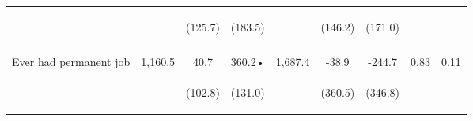 \begin{tabular}{lcccccccc}
 & \begin{footnotesize}\end{footnotesize} & \begin{footnotesize}(125.7)\end{footnotesize} & \begin{footnotesize}(183.5)\end{footnotesize} & \begin{footnotesize}\end{footnotesize} & \begin{footnotesize}(146.2)\end{footnotesize} & \begin{footnotesize}(171.0)\end{footnotesize} & \begin{footnotesize}\end{footnotesize} & \begin{footnotesize}\end{footnotesize}\\
 & \begin{footnotesize}\end{footnotesize} & \begin{footnotesize}[1.000]\end{footnotesize} & \begin{footnotesize}[0.049]\end{footnotesize} & \begin{footnotesize}\end{footnotesize} & \begin{footnotesize}[1.000]\end{footnotesize} & \begin{footnotesize}[0.367]\end{footnotesize} & \begin{footnotesize}\end{footnotesize} & \begin{footnotesize}\end{footnotesize}\\
\noalign{\smallskip}Ever had permanent job & 1,160.5 & 40.7 & 360.2• & 1,687.4 & -38.9 & -244.7 & 0.83 & 0.11\\
 & \begin{footnotesize}\end{footnotesize} & \begin{footnotesize}(102.8)\end{footnotesize} & \begin{footnotesize}(131.0)\end{footnotesize} & \begin{footnotesize}\end{footnotesize} & \begin{footnotesize}(360.5)\end{footnotesize} & \begin{footnotesize}(346.8)\end{footnotesize} & \begin{footnotesize}\end{footnotesize} & \begin{footnotesize}\end{footnotesize}\\

\end{tabular}
